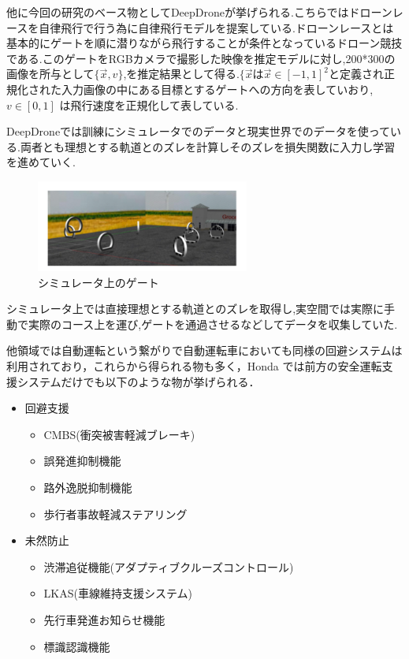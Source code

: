 他に今回の研究のベース物としてDeepDrone\cite{DeepDrone}が挙げられる.こちらではドローンレースを自律飛行で行う為に自律飛行モデルを提案している.ドローンレースとは基本的にゲートを順に潜りながら飛行することが条件となっているドローン競技である.このゲートをRGBカメラで撮影した映像を推定モデルに対し,200*300の画像を所与として$\lbrace \vec{x}, v \rbrace$,を推定結果として得る.$\lbrace \vec{x}$は$\vec{x} \in [-1,1]^2$と定義され正規化された入力画像の中にある目標とするゲートへの方向を表していおり, $v \in [0,1]$ は飛行速度を正規化して表している.

DeepDroneでは訓練にシミュレータでのデータと現実世界でのデータを使っている.両者とも理想とする軌道とのズレを計算しそのズレを損失関数に入力し学習を進めていく.
\begin{figure}[htbp]
  \begin{center}
    \includegraphics[clip,width=7.0cm]{img/deep-simu.png}
    \caption{シミュレータ上のゲート}
    \label{fig:gate}
  \end{center}
\end{figure}
シミュレータ上では直接理想とする軌道とのズレを取得し,実空間では実際に手動で実際のコース上を運び,ゲートを通過させるなどしてデータを収集していた.


他領域では自動運転という繋がりで自動運転車においても同様の回避システムは利用されており，これらから得られる物も多く，Honda\cite{Honda} では前方の安全運転支援システムだけでも以下のような物が挙げられる．

\begin{itemize}
\item 回避支援
  \begin{itemize}
    \item CMBS(衝突被害軽減ブレーキ)
    \item 誤発進抑制機能
    \item 路外逸脱抑制機能
    \item 歩行者事故軽減ステアリング
  \end{itemize}
\item 未然防止
  \begin{itemize}
    \item 渋滞追従機能(アダプティブクルーズコントロール)
    \item LKAS(車線維持支援システム)
    \item 先行車発進お知らせ機能
    \item 標識認識機能
  \end{itemize}
\end{itemize}
